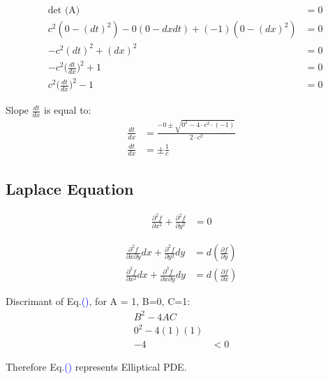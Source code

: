 \documentclass[fleqn,10pt]{SelfArx} %
\newcommand{\myeqref}[1]{Eq.\textcolor{blue}{\textup{(\getrefnumber{#1})}}}
\begin{document}
\begin{align*}
	& \text{det (A)}                       & = 0 \\
	& c^2(0-(dt)^2) - 0(0-dxdt) + (-1)(0-(dx)^2) & = 0 \\
	& -c^2(dt)^2 + (dx)^2                        & = 0 \\
	& -c^2\Big(\frac{dt}{dx}\Big)^2 + 1          & = 0 \\
	& c^2\Big(\frac{dt}{dx}\Big)^2 - 1           & = 0
\end{align*}

Slope $\frac{dt}{dx}$ is equal to:
\begin{align*}
	\frac{dt}{dx} & = \frac{-0 \pm \sqrt{0^2 -4 \cdot c^2\cdot (-1)}}{2\cdot c^2} \\
	\frac{dt}{dx} & = \pm \frac{1}{c}
\end{align*}

\subsection{Laplace Equation}
\begin{align*}
	\frac{\partial^2 f}{\partial x^2} + \frac{\partial^2 f}{\partial y^2}           &= 0 \tag{8.8} \label{eq:8.8}
\end{align*}


\begin{align*}
	\frac{\partial^2 f}{\partial x \partial y}dx + \frac{\partial^2 f}{\partial y^2}dy &= d\left(\frac{\partial f}{\partial y}\right) \tag{8.9} \label{eq:8.9} \\
	\frac{\partial^2 f}{\partial x^2}dx + \frac{\partial^2 f}{\partial x \partial y}dy &= d\left(\frac{\partial f}{\partial x}\right) \tag{8.10} \label{eq:8.10}
\end{align*}

Discrimant of \myeqref{eq:8.7}, for A = 1, B=0, C=1:
\begin{align*}
	B^2 - 4AC     &    \\
	0^2 - 4(1)(1) &    \\
	-4            & <0
\end{align*}

Therefore \myeqref{eq:8.8} represents Elliptical PDE.
\end{document}
